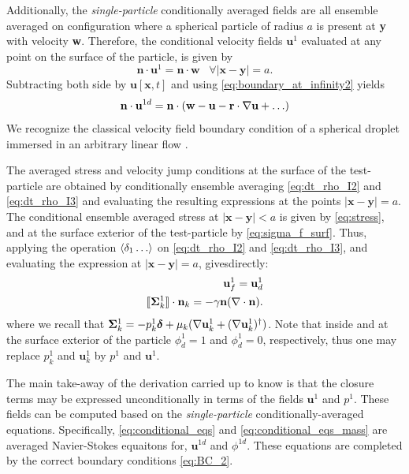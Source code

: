 Additionally, the \textit{single-particle} conditionally averaged fields are all ensemble averaged on configuration where a spherical particle of radius $a$ is present at \textbf{y} with velocity \textbf{w}.
Therefore, the conditional velocity fields $\textbf{u}^1$ evaluated at any point on the surface of the particle, is given by 
\begin{equation}
    \textbf{n}\cdot \textbf{u}^1= \textbf{n} \cdot \textbf{w} \;\;\;\forall |\textbf{x} - \textbf{y}| = a. 
\end{equation}
Subtracting both side by $\textbf{u}[\textbf{x},t]$ and using \ref{eq:boundary_at_infinity2} yields
\begin{equation}
    \textbf{n}\cdot\textbf{u}^{1d}
    = \textbf{n}\cdot(
    \textbf{w} 
    - \textbf{u}
    -\textbf{r} \cdot \grad\textbf{u} 
    + \ldots
    )
    \label{eq:BC_1}
\end{equation}
We recognize the classical velocity field boundary condition of a spherical droplet immersed in an arbitrary linear flow \citep{nadim}. 

The averaged stress and velocity jump conditions at the surface of the test-particle are obtained by conditionally ensemble averaging \ref{eq:dt_rho_I2} and \ref{eq:dt_rho_I3} and evaluating the resulting expressions at the points $|\textbf{x}-\textbf{y}| =a$. 
The conditional ensemble averaged stress at $|\textbf{x}-\textbf{y}| < a$ is given by \eqref{eq:stress}, and at the surface exterior of the test-particle by \ref{eq:sigma_f_surf}. 
Thus, applying the operation $\left<\delta_1 \ldots\right>$ on \ref{eq:dt_rho_I2} and \ref{eq:dt_rho_I3}, and evaluating the expression at $|\textbf{x}-\textbf{y}| =a$, givesdirectly:  
\begin{align}
    \label{eq:BC_2}
    \textbf{u}_f^1 = \textbf{u}_d^1\\
    \Jump{\bm{\Sigma}_k^1} 
    =
    - \gamma\textbf{n}(\div \textbf{n}). 
    \label{eq:BC_3}
\end{align}
where we recall that $\bm{\Sigma}_k^1 = -p_k^1\bm\delta + \mu_k (\mathbf{\nabla} \textbf{u}_k^1 + (\mathbf{\nabla} \textbf{u}_k^1)^\dagger)$. 
Note that inside and at the surface exterior of the particle $\phi_d^1 = 1$ and $\phi_d^1 =0$, respectively, thus one may replace $p_k^1$ and $\textbf{u}_k^1$ by $p^1$ and $\textbf{u}^1$. 



The main take-away of the derivation carried up to know is that the closure terms may be expressed unconditionally in terms of the fields $\textbf{u}^1$ and $p^1$. 
These fields can be computed based on the \textit{single-particle} conditionally-averaged equations.
Specifically, \ref{eq:conditional_eqs} and \ref{eq:conditional_eqs_mass} are averaged Navier-Stokes equaitons for, $\textbf{u}^{1d}$ and $\phi^{1d}$. 
These equations are completed by the correct boundary conditions \ref{eq:BC_2}. 

